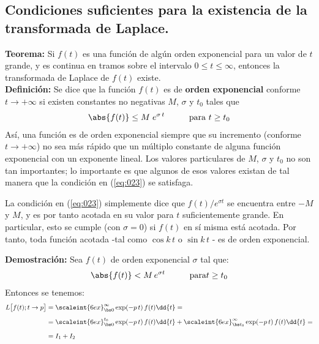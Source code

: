 \subsection{Condiciones suficientes para la existencia de la transformada de Laplace.}

\noindent \textbf{Teorema: } Si $f (t)$ es una función de algún orden exponencial para un valor de $t$ grande, y es continua en tramos sobre el intervalo $0 \leq t \leq \infty$, entonces la transformada de Laplace de $f (t)$ existe.
\\[0.5em]
\textbf{Definición: } Se dice que la función $f (t)$ es de \textbf{orden exponencial} conforme $t \to + \infty$ si existen constantes no negativas $M$, $\sigma$ y $t_{0}$ tales que
\begin{align}
\abs{f (t)} \leq M \; e^{\sigma \, t} \hspace{1cm} \mbox{para } t \geq t_{0}
\label{eq:023}
\end{align}
Así, una función es de orden exponencial siempre que su incremento (conforme $t \to + \infty$) no sea más rápido que un múltiplo constante de alguna función exponencial con un exponente lineal. Los valores particulares de $M$, $\sigma$ y $t_{0}$ no son tan importantes; lo importante es que algunos de esos valores existan de tal manera que la condición en (\ref{eq:023}) se satisfaga.
\par
La condición en (\ref{eq:023}) simplemente dice que $f (t) / e^{\sigma t}$ se encuentra entre $-M$ y $M$, y es por tanto acotada en su valor para $t$ suficientemente grande. En particular, esto se cumple (con $\sigma = 0$) si $f (t)$ en sí misma está acotada. Por tanto, toda función acotada -tal como $\cos k \, t$ o $\sin k \, t$ - es de orden exponencial.
\par
\noindent \textbf{Demostración: } Sea $f (t)$ de orden exponencial $\sigma$ tal que:
\begin{align*}
\abs{f (t)} < M \, e^{\sigma t} \hspace{1cm} \mbox{para} t \geq t_{0}
\end{align*}
Entonces se tenemos:
\begin{align*}
L \big[ f (t); t \to p \big] &= \scaleint{6ex}_{\bs 0}^{\infty} \exp(-p \, t) \, f (t) \dd{t} = \\[0.5em]
&= \scaleint{6ex}_{\bs 0}^{t_{0}} \exp(-p \, t) \, f (t) \dd{t} + \scaleint{6ex}_{\bs t_{0}}^{\infty} \exp(-p \, t) \, f (t) \dd{t} = \\[0.5em]
&= I_{1} + I_{2}
\end{align*}
